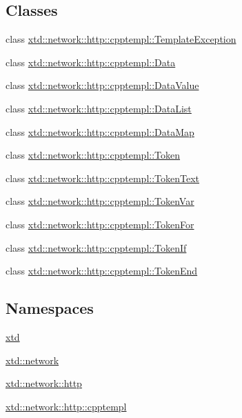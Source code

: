 \subsection*{Classes}
\begin{DoxyCompactItemize}
\item 
class \hyperlink{classxtd_1_1network_1_1http_1_1cpptempl_1_1TemplateException}{xtd\+::network\+::http\+::cpptempl\+::\+Template\+Exception}
\item 
class \hyperlink{classxtd_1_1network_1_1http_1_1cpptempl_1_1Data}{xtd\+::network\+::http\+::cpptempl\+::\+Data}
\item 
class \hyperlink{classxtd_1_1network_1_1http_1_1cpptempl_1_1DataValue}{xtd\+::network\+::http\+::cpptempl\+::\+Data\+Value}
\item 
class \hyperlink{classxtd_1_1network_1_1http_1_1cpptempl_1_1DataList}{xtd\+::network\+::http\+::cpptempl\+::\+Data\+List}
\item 
class \hyperlink{classxtd_1_1network_1_1http_1_1cpptempl_1_1DataMap}{xtd\+::network\+::http\+::cpptempl\+::\+Data\+Map}
\item 
class \hyperlink{classxtd_1_1network_1_1http_1_1cpptempl_1_1Token}{xtd\+::network\+::http\+::cpptempl\+::\+Token}
\item 
class \hyperlink{classxtd_1_1network_1_1http_1_1cpptempl_1_1TokenText}{xtd\+::network\+::http\+::cpptempl\+::\+Token\+Text}
\item 
class \hyperlink{classxtd_1_1network_1_1http_1_1cpptempl_1_1TokenVar}{xtd\+::network\+::http\+::cpptempl\+::\+Token\+Var}
\item 
class \hyperlink{classxtd_1_1network_1_1http_1_1cpptempl_1_1TokenFor}{xtd\+::network\+::http\+::cpptempl\+::\+Token\+For}
\item 
class \hyperlink{classxtd_1_1network_1_1http_1_1cpptempl_1_1TokenIf}{xtd\+::network\+::http\+::cpptempl\+::\+Token\+If}
\item 
class \hyperlink{classxtd_1_1network_1_1http_1_1cpptempl_1_1TokenEnd}{xtd\+::network\+::http\+::cpptempl\+::\+Token\+End}
\end{DoxyCompactItemize}
\subsection*{Namespaces}
\begin{DoxyCompactItemize}
\item 
 \hyperlink{namespacextd}{xtd}
\item 
 \hyperlink{namespacextd_1_1network}{xtd\+::network}
\item 
 \hyperlink{namespacextd_1_1network_1_1http}{xtd\+::network\+::http}
\item 
 \hyperlink{namespacextd_1_1network_1_1http_1_1cpptempl}{xtd\+::network\+::http\+::cpptempl}
\end{DoxyCompactItemize}
